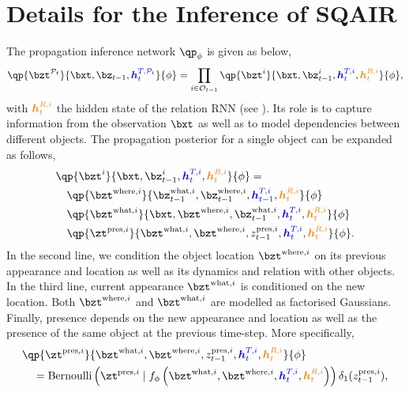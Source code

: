 \section{Details for the Inference of SQAIR} 
\label{apd:sqair_inference}

The propagation inference network $\qp_{\phi}$ is given as below,
\begin{equation} \label{eq:q_prop}
    \qp{\bzt^{\mathcal{P}_t}}{\bxt, \bz_{t-1}, \hT{t}{\mathcal{P}_t}}{\phi}
        = \prod_{i \in {\mathcal{O}_{t-1}}} \qp{\bzt^i}{\bxt, \bz_{t-1}^{i}, \hT{t}{i}, \hR{t}{i}}{\phi},
\end{equation}
with $\textcolor{orange}{\bm{h}_{t}^{R, i}}$ the hidden state of the relation \gls{RNN} (see ). Its role is to capture information from the observation $\bxt$ as well as to model dependencies between different objects.
The propagation posterior for a single object can be expanded as follows,
\begin{equation} \label{eq:q_prop_obj}
\begin{aligned}
    &\qp{\bzt^i}{\bxt,\bz_{t-1}^{i}, \hT{t}{i}, \hR{t}{i}}{\phi} =\\
        &\quad \qp{\bzt^{\mathrm{where}, i}}{\bz_{t-1}^{\mathrm{what}, i}, \bz_{t-1}^{\mathrm{where}, i}, \hT{t-1}{i}, \hR{t}{i}}{\phi}\\
        &\quad \qp{\bzt^{\mathrm{what}, i}}{\bxt, \bzt^{\mathrm{where}, i}, \bz_{t-1}^{\mathrm{what}, i}, \hT{t}{i}, \hR{t}{i}}{\phi}\\
        &\quad \qp{\zt^{\mathrm{pres}, i}}{\bzt^{\mathrm{what}, i}, \bzt^{\mathrm{where}, i}, z_{t-1}^{\mathrm{pres}, i}, \hT{t}{i}, \hR{t}{i}}{\phi}.
\end{aligned}
\end{equation}
In the second line, we condition the object location $\bzt^{\mathrm{where}, i}$ on its previous appearance and location as well as its dynamics and relation with other objects.
In the third line, current appearance $\bzt^{\mathrm{what}, i}$ is conditioned on the new location.
Both $\bzt^{\mathrm{where}, i}$ and $\bzt^{\mathrm{what}, i}$ are modelled as factorised Gaussians.
Finally, presence depends on the new appearance and location as well as the presence of the same object at the previous time-step.
More specifically, 
\begin{equation} \label{eq:q_prop_presence}
\begin{aligned}
    &\qp{\zt^{\mathrm{pres}, i}}{\bzt^{\mathrm{what}, i}, \bzt^{\mathrm{where}, i}, z_{t-1}^{\mathrm{pres}, i}, \hT{t}{i}, \hR{t}{i}}{\phi}\\
        &\quad= \bern \left(
            \zt^{\mathrm{pres}, i} \mid f_\phi \left(
                \bzt^{\mathrm{what}, i}, \bzt^{\mathrm{where}, i}, \hT{t}{i}, \hR{t}{i}
            \right)
        \right)
        \delta_1( z_{t-1}^{\mathrm{pres}, i}),
\end{aligned}
\end{equation}
